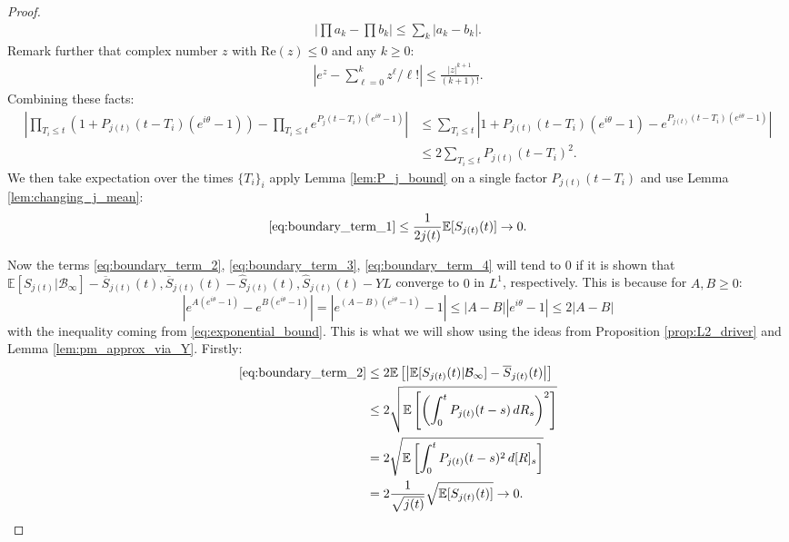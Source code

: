 \documentclass{article}
\numberwithin{equation}{section}
\begin{document}
\begin{proof}
\begin{align*}
        \left|\prod a_k-\prod b_k\right|\leq \sum_{k} |a_k-b_k|.
    \end{align*}
    Remark further that complex number $z$ with $\text{Re}(z)\leq 0$ and any $k\geq 0$:
    \begin{align}
        \left|e^{z}-\sum_{\ell=0}^k z^\ell/\ell!\right|\leq \frac{|z|^{k+1}}{(k+1)!}.\label{eq:exponential_bound}
    \end{align}
    Combining these facts:
    \begin{align*}
        \left|\prod_{T_i\leq t}\left(1+P_{j(t)}(t-T_i)(e^{i\theta}-1)\right)-\prod_{T_i\leq t}e^{P_j(t-T_i)(e^{i\theta}-1)}\right|&\leq \sum_{T_i\leq t}\left|1+P_{j(t)}(t-T_i)(e^{i\theta}-1)-e^{P_{j(t)}(t-T_i)(e^{i\theta}-1)}\right|\\
        &\leq 2 \sum_{T_i\leq t}P_{j(t)}(t-T_i)^2.
    \end{align*}
    We then take expectation over the times $\{T_i\}_i$ apply Lemma \ref{lem:P_j_bound} on a single factor $P_{j(t)}(t-T_i)$ and use Lemma \ref{lem:changing_j_mean}:
    \begin{align*}
        \ref{eq:boundary_term_1}\leq \frac{1}{2j(t)}\mathbb{E}[S_{j(t)}(t)]\to 0.
    \end{align*}

    Now the terms \ref{eq:boundary_term_2}, \ref{eq:boundary_term_3}, \ref{eq:boundary_term_4} will tend to $0$ if it is shown that $\mathbb{E}[S_{j(t)}|\mathcal{B}_\infty]-\overline{S}_{j(t)}(t),\overline{S}_{j(t)}(t)-\widehat{S}_{j(t)}(t),\widehat{S}_{j(t)}(t)-YL$ converge to $0$ in $L^1$, respectively. This is because for $A,B\geq 0$:
    \[\left|e^{A\left(e^{i\theta}-1\right)}-e^{B\left(e^{i\theta}-1\right)}\right|=\left|e^{(A-B)\left(e^{i\theta}-1\right)}-1\right|\leq |A-B|\left|e^{i\theta}-1\right|\leq 2|A-B|\]
    with the inequality coming from \ref{eq:exponential_bound}. This is what we will show using the ideas from Proposition \ref{prop:L2_driver} and Lemma \ref{lem:pm_approx_via_Y}. Firstly:
    \begin{align*}
      \ref{eq:boundary_term_2}&\leq 2\mathbb{E}\left[\left|\mathbb{E}[S_{j(t)}(t)|\mathcal{B}_\infty]-\overline{S}_{j(t)}(t)\right|\right]\\
      &\leq 2\sqrt{\mathbb{E}\left[\left(\int_0^t P_{j(t)}(t-s)\,dR_s\right)^2\right]}\\
      &= 2\sqrt{\mathbb{E}\left[\int_0^t P_{j(t)}(t-s)^2\,d[R]_s\right]}\\
      &=2\frac{1}{\sqrt{j(t)}}\sqrt{\mathbb{E}[S_{j(t)}(t)]}\to 0.
    \end{align*}


\end{proof}
\end{document}
